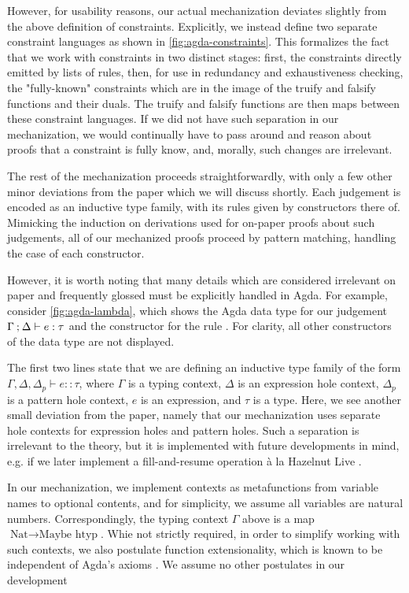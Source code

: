 However, for usability reasons, our actual mechanization deviates slightly from the above definition of constraints. Explicitly, we instead define two separate constraint languages as shown in \autoref{fig:agda-constraints}. This formalizes the fact that we work with constraints in two distinct stages: first, the constraints directly emitted by lists of rules, then, for use in redundancy and exhaustiveness checking, the "fully-known" constraints which are in the image of the truify and falsify functions and their duals. The truify and falsify functions are then maps between these constraint languages. If we did not have such separation in our mechanization, we would continually have to pass around and reason about proofs that a constraint is fully know, and, morally, such changes are irrelevant.



The rest of the mechanization proceeds straightforwardly, with only a few other minor deviations from the paper which we will discuss shortly. Each judgement is encoded as an inductive type family, with its rules given by constructors there of. Mimicking the induction on derivations used for on-paper proofs about such judgements, all of our mechanized proofs proceed by pattern matching, handling the case of each constructor. 

However, it is worth noting that many details which are considered irrelevant on paper and frequently glossed must be explicitly handled in Agda. For example, consider \autoref{fig:agda-lambda}, which shows the Agda data type for our judgement $\Gamma \mathbin{;} \Delta \vdash e : \tau$ and the constructor for the rule \TLam. For clarity, all other constructors of the data type are not displayed.



The first two lines state that we are defining an inductive type family of the form $\Gamma, \Delta, \Delta_p \vdash e :: \tau$, where $\Gamma$ is a typing context, $\Delta$ is an expression hole context, $\Delta_p$ is a pattern hole context, $e$ is an expression, and $\tau$ is a type. Here, we see another small deviation from the paper, namely that our mechanization uses separate hole contexts for expression holes and pattern holes. Such a separation is irrelevant to the theory, but it is implemented with future developments in mind, e.g. if we later implement a fill-and-resume operation \`a la Hazelnut Live \cite{DBLP:journals/pacmpl/OmarVCH19}. 

In our mechanization, we implement contexts as metafunctions from variable names to optional contents, and for simplicity, we assume all variables are natural numbers. Correspondingly, the typing context $\Gamma$ above is a map $\text{Nat} \to \text{Maybe htyp}$. Whie not strictly required, in order to simplify working with such contexts, we also postulate function extensionality, which is known to be independent of Agda's axioms \cite{DBLP:conf/lics/AwodeyGS12}. We assume no other postulates in our development

